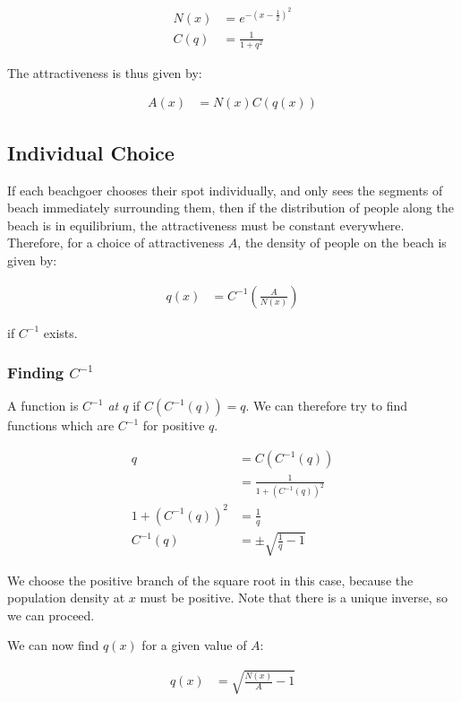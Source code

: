 \documentclass{article}
\begin{document}
\begin{align}
	N(x) & = e^{-\left( x - \frac12\right)^2} \\
	C(q) & = \frac 1 {1 + q^2}
\end{align}

The attractiveness is thus given by:

\begin{align}
	A(x) & = N(x) C( q( x) )
\end{align}

\subsection{Individual Choice}

If each beachgoer chooses their spot individually, and only sees the segments
	of beach immediately surrounding them, then if the distribution
	of people along the beach is in equilibrium, the attractiveness must be 
	constant everywhere.
Therefore, for a choice of attractiveness $A$, the density of people
	on the beach is given by:

\begin{align}
	q(x) & = C^{-1} \left( \frac A {N(x)} \right)
\end{align}

if $C^{-1}$ exists.

\subsubsection{Finding $C^{-1}$}

A function is \emph{$C^{-1}$ at $q$} if $C(C^{-1}(q)) = q$.
We can therefore try to find functions which are $C^{-1}$ for positive $q$.

\begin{align}
q & = C(C^{-1}(q)) \nonumber \\
	& = \frac 1 {1 + \left(C^{-1}(q)\right)^2 } \nonumber \\
1 + \left(C^{-1}(q)\right)^2 & = \frac 1 q \nonumber \\
C^{-1}(q) & = \pm \sqrt{ \frac 1 q - 1 }
\end{align} 

We choose the positive branch of the square root in this case, because
	the population density at $x$ must be positive.
Note that there is a unique inverse, so we can proceed.

We can now find $q(x)$ for a given value of $A$:

\begin{align}
q(x) & = \sqrt{ \frac {N(x)} A - 1 }
\end{align}
\end{document}
